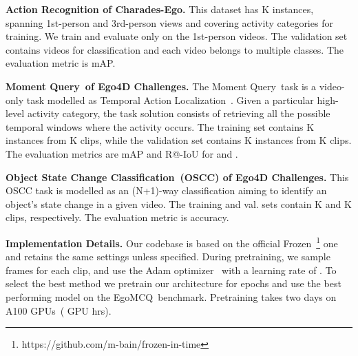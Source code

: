 \documentclass{article}
\newcommand{\eval}{EgoMCQ}
\newcommand{\mq}{Moment Query}
\newcommand{\ossc}{Object State Change Classification}
\begin{document}
\textbf{Action Recognition of Charades-Ego.}
This dataset has K instances, spanning 1st-person and 3rd-person views and covering  activity categories for training. We train and evaluate only on the 1st-person videos. 
The validation set contains  videos for classification and each video belongs to multiple classes. 
The evaluation metric is mAP. 

\textbf{\mq~of Ego4D Challenges.}
The \mq~task is a video-only task modelled as Temporal Action Localization~\cite{caba2015activitynet}. Given a particular high-level activity category, the task solution consists of retrieving all the possible temporal windows where the activity occurs. 
The training set contains K instances from K clips, while the validation set contains K instances from K clips. 
The evaluation metrics are mAP and R@-IoU for  and .

\textbf{\ossc~(OSCC) of Ego4D Challenges.}
This OSCC task is modelled as an (N+1)-way classification aiming to identify an object's state change in a given video.
The training and val. sets contain K and K clips, respectively.
The evaluation metric is accuracy. 

\textbf{Implementation Details.} Our codebase is based on the official Frozen~\footnote{https://github.com/m-bain/frozen-in-time} one and retains the same settings unless specified. During pretraining, 
we sample  frames for each clip,
and use the Adam optimizer~\cite{kingma2014adam} with a learning rate of . To select the best method we pretrain our architecture for  epochs and use the best performing model on the \eval~benchmark. Pretraining takes two days on  A100 GPUs~( GPU hrs).
\end{document}
